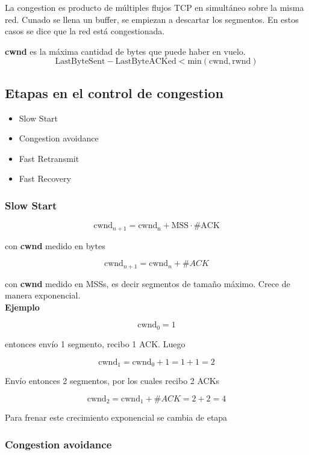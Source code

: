 \documentclass[titlepage,a4paper]{article}
\begin{document}
La congestion es producto de múltiples flujos TCP en simultáneo sobre la misma red. Cunado se llena un buffer, se empiezan a descartar los segmentos. En estos casos se dice que la red está congestionada.

\textbf{cwnd} es la máxima cantidad de bytes que puede haber en vuelo.
$$ \mathrm{LastByteSent}-\mathrm{LastByteACKed} < \mathrm{min}(\mathrm{cwnd},\mathrm{rwnd}) $$


\subsection{Etapas en el control de congestion}

\begin{itemize}
    \item Slow Start
    \item Congestion avoidance
    \item Fast Retransmit
    \item Fast Recovery
\end{itemize}

\subsubsection{Slow Start}

$$\mathrm{cwnd}_{n+1} = \mathrm{cwnd_n} + \mathrm{MSS} \cdot \#\mathrm{ACK} $$

con \textbf{cwnd} medido en bytes


$$\mathrm{cwnd}_{n+1} = \mathrm{cwnd}_n + \#ACK $$

con \textbf{cwnd} medido en MSSs, es decir segmentos de tamaño máximo. Crece de manera exponencial. \\

\textbf{Ejemplo}



$$ \mathrm{cwnd}_0 = 1 $$

entonces envío 1 segmento, recibo 1 ACK. Luego 

$$ \mathrm{cwnd}_1 = \mathrm{cwnd}_0 + 1 = 1 + 1 = 2 $$

Envío entonces 2 segmentos, por los cuales recibo 2 ACKs

$$ \mathrm{cwnd}_2 = \mathrm{cwnd}_1 + \#ACK = 2 + 2 = 4 $$

Para frenar este crecimiento exponencial se cambia de etapa

\subsubsection{Congestion avoidance}
\end{document}
